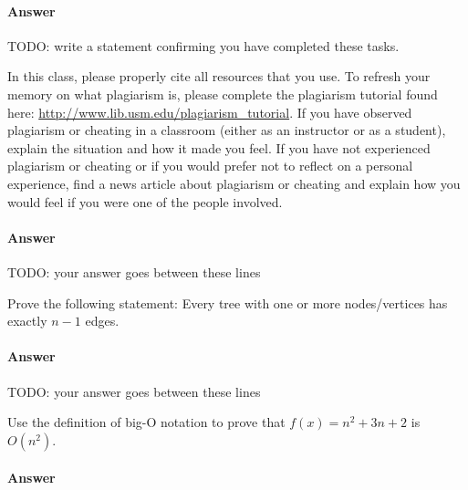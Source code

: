 \documentclass{article}
\begin{document}
\paragraph{Answer}


TODO: write a statement confirming you have completed these tasks.



\nextprob
\collab{}

    In this class,
    please properly cite all resources that you use.
    To refresh your memory on what plagiarism is,
    please
    complete the plagiarism tutorial found here:
    \url{http://www.lib.usm.edu/plagiarism_tutorial}.
    If you have observed plagiarism or cheating in a classroom (either as an
    instructor or as a student), explain the situation and how it made you
    feel.  If you have not experienced plagiarism or cheating or if you would
    prefer not to reflect on a personal experience, find a news
    article about plagiarism or cheating and explain how you would feel if you
    were one of the people involved.


\paragraph{Answer}


TODO: your answer goes between these lines




\nextprob
Prove the following statement: Every tree with one or more nodes/vertices has
exactly $n-1$ edges.

\paragraph{Answer}


TODO: your answer goes between these lines




\nextprob
Use the definition of big-O notation to prove that $f(x)=n^2 + 3n +2$ is
$O(n^2)$.

\paragraph{Answer}
\end{document}
